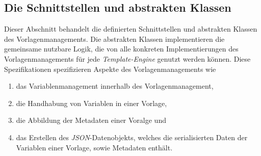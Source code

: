 \subsection{Die Schnittstellen und abstrakten Klassen}
Dieser Abschnitt behandelt die definierten Schnittstellen und abstrakten Klassen des Vorlagenmanagements. Die abstrakten Klassen implementieren die gemeinsame nutzbare Logik, die von alle konkreten Implementierungen des Vorlagenmanagements für jede \emph{Template-Engine} genutzt werden können. Diese Spezifikationen spezifizieren Aspekte des Vorlagenmanagements wie
\begin{enumerate}
	\item das Variablenmanagement innerhalb des Vorlagenmanagement,
	\item die Handhabung von Variablen in einer Vorlage,
	\item die Abbildung der Metadaten einer Voralge und 
	\item das Erstellen des \emph{JSON}-Datenobjekts, welches die serialisierten Daten der Variablen einer Vorlage, sowie Metadaten enthält.
\end{enumerate}

